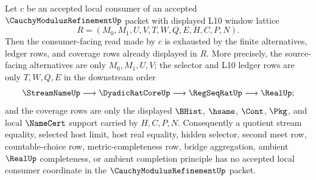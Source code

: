 \begin{lemma}
\label{lem:cauchy-modulus-refinement-l10-window-lattice-downstream-coverage}
Let $c$ be an accepted local consumer of an accepted $\CauchyModulusRefinementUp$ packet with displayed L10 window lattice
$$
R=(M_0,M_1,U,V,T,W,Q,E,H,C,P,N).
$$
Then the consumer-facing read made by $c$ is exhausted by the finite alternatives, ledger rows, and coverage rows already displayed in $R$. More precisely, the source-facing alternatives are only $M_0,M_1,U,V$; the selector and L10 ledger rows are only $T,W,Q,E$ in the downstream order
$$
\StreamNameUp \longrightarrow \DyadicRatCoreUp \longrightarrow \RegSeqRatUp \longrightarrow \RealUp;
$$
and the coverage rows are only the displayed $\BHist$, $\hsame$, $\Cont$, $\Pkg$, and local $\NameCert$ support carried by $H,C,P,N$. Consequently a quotient stream equality, selected host limit, host real equality, hidden selector, second meet row, countable-choice row, metric-completeness row, bridge aggregation, ambient $\RealUp$ completeness, or ambient completion principle has no accepted local consumer coordinate in the $\CauchyModulusRefinementUp$ packet.
\end{lemma}
